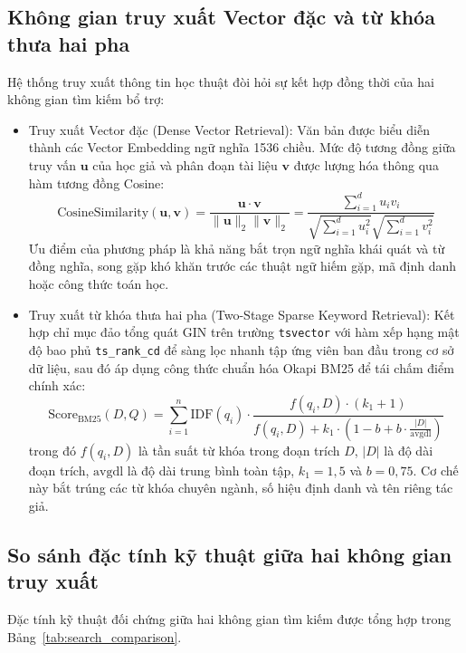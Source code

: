 \subsection{Không gian truy xuất Vector đặc và từ khóa thưa hai pha}
\label{subsec:dense_sparse_retrieval}
Hệ thống truy xuất thông tin học thuật đòi hỏi sự kết hợp đồng thời của hai không gian tìm kiếm bổ trợ:

\begin{itemize}
    \item Truy xuất Vector đặc (Dense Vector Retrieval): Văn bản được biểu diễn thành các Vector Embedding ngữ nghĩa 1536 chiều. Mức độ tương đồng giữa truy vấn $\mathbf{u}$ của học giả và phân đoạn tài liệu $\mathbf{v}$ được lượng hóa thông qua hàm tương đồng Cosine:
    \begin{equation}
    \label{eq:cosine_sim}
    \text{CosineSimilarity}(\mathbf{u}, \mathbf{v}) = \frac{\mathbf{u} \cdot \mathbf{v}}{\|\mathbf{u}\|_2 \|\mathbf{v}\|_2} = \frac{\sum_{i=1}^{d} u_i v_i}{\sqrt{\sum_{i=1}^{d} u_i^2} \sqrt{\sum_{i=1}^{d} v_i^2}}
    \end{equation}
    Ưu điểm của phương pháp là khả năng bắt trọn ngữ nghĩa khái quát và từ đồng nghĩa, song gặp khó khăn trước các thuật ngữ hiếm gặp, mã định danh hoặc công thức toán học.
    
    \item Truy xuất từ khóa thưa hai pha (Two-Stage Sparse Keyword Retrieval): Kết hợp chỉ mục đảo tổng quát GIN trên trường \texttt{tsvector} với hàm xếp hạng mật độ bao phủ \texttt{ts\_rank\_cd} để sàng lọc nhanh tập ứng viên ban đầu trong cơ sở dữ liệu, sau đó áp dụng công thức chuẩn hóa Okapi BM25 để tái chấm điểm chính xác:
    \begin{equation}
    \label{eq:bm25}
    \text{Score}_{\text{BM25}}(D, Q) = \sum_{i=1}^{n} \text{IDF}(q_i) \cdot \frac{f(q_i, D) \cdot (k_1 + 1)}{f(q_i, D) + k_1 \cdot \left(1 - b + b \cdot \frac{|D|}{\text{avgdl}}\right)}
    \end{equation}
    trong đó $f(q_i, D)$ là tần suất từ khóa trong đoạn trích $D$, $|D|$ là độ dài đoạn trích, $\text{avgdl}$ là độ dài trung bình toàn tập, $k_1 = 1{,}5$ và $b = 0{,}75$. Cơ chế này bắt trúng các từ khóa chuyên ngành, số hiệu định danh và tên riêng tác giả.
\end{itemize}

\subsection{So sánh đặc tính kỹ thuật giữa hai không gian truy xuất}
\label{subsec:search_comparison}
Đặc tính kỹ thuật đối chứng giữa hai không gian tìm kiếm được tổng hợp trong Bảng~\ref{tab:search_comparison}.

